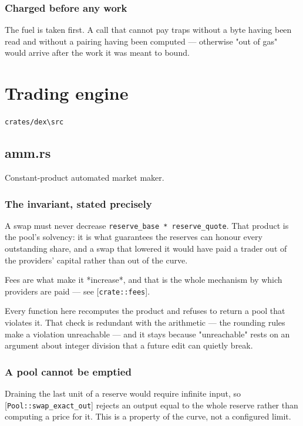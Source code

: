 \documentclass[11pt,a4paper]{article}
\begin{document}
\subsubsection{Charged before any work}

The fuel is taken first. A call that cannot pay traps without a byte having
been read and without a pairing having been computed — otherwise
"out of gas" would arrive after the work it was meant to bound.

\section{Trading engine}
\noindent\texttt{crates/dex\textbackslash{}src}

\subsection{amm.rs}
Constant-product automated market maker.

\subsubsection{The invariant, stated precisely}

A swap must never decrease \texttt{reserve\_base * reserve\_quote}. That product is
the pool's solvency: it is what guarantees the reserves can honour every
outstanding share, and a swap that lowered it would have paid a trader out
of the providers' capital rather than out of the curve.

Fees are what make it *increase*, and that is the whole mechanism by which
providers are paid — see [\texttt{crate::fees}].

Every function here recomputes the product and refuses to return a pool that
violates it. That check is redundant with the arithmetic — the rounding
rules make a violation unreachable — and it stays because "unreachable"
rests on an argument about integer division that a future edit can quietly
break.

\subsubsection{A pool cannot be emptied}

Draining the last unit of a reserve would require infinite input, so
[\texttt{Pool::swap\_exact\_out}] rejects an output equal to the whole reserve rather
than computing a price for it. This is a property of the curve, not a
configured limit.
\end{document}
